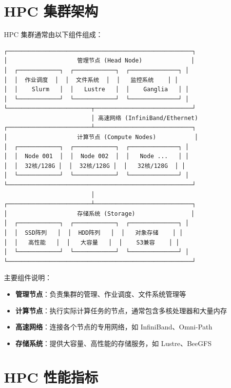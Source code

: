 \documentclass[12pt,UTF8]{ctexbook}
\begin{document}
\section{HPC 集群架构}
\label{sec:hpc_cluster_architecture}

HPC 集群通常由以下组件组成：

\begin{verbatim}
┌─────────────────────────────────────────────────────┐
│                    管理节点 (Head Node)              │
│  ┌────────────┐  ┌────────────┐  ┌──────────────┐ │
│  │  作业调度  │  │  文件系统  │  │   监控系统    │ │
│  │    Slurm   │  │   Lustre   │  │    Ganglia   │ │
│  └────────────┘  └────────────┘  └──────────────┘ │
└────────────────────────┬────────────────────────────┘
                         │ 高速网络 (InfiniBand/Ethernet)
┌────────────────────────┴────────────────────────────┐
│                    计算节点 (Compute Nodes)           │
│  ┌────────────┐  ┌────────────┐  ┌──────────────┐ │
│  │  Node 001  │  │  Node 002  │  │   Node ...   │ │
│  │  32核/128G │  │  32核/128G │  │   32核/128G  │ │
│  └────────────┘  └────────────┘  └──────────────┘ │
└─────────────────────────────────────────────────────┘
                         │
┌────────────────────────┴────────────────────────────┐
│                    存储系统 (Storage)                │
│  ┌────────────┐  ┌────────────┐  ┌──────────────┐ │
│  │  SSD阵列   │  │  HDD阵列   │  │   对象存储    │ │
│  │   高性能   │  │   大容量   │  │    S3兼容    │ │
│  └────────────┘  └────────────┘  └──────────────┘ │
└─────────────────────────────────────────────────────┘
\end{verbatim}

主要组件说明：
\begin{itemize}
    \item \textbf{管理节点}：负责集群的管理、作业调度、文件系统管理等
    \item \textbf{计算节点}：执行实际计算任务的节点，通常包含多核处理器和大量内存
    \item \textbf{高速网络}：连接各个节点的专用网络，如 InfiniBand、Omni-Path
    \item \textbf{存储系统}：提供大容量、高性能的存储服务，如 Lustre、BeeGFS
\end{itemize}

\section{HPC 性能指标}
\label{sec:hpc_performance_metrics}
\end{document}
